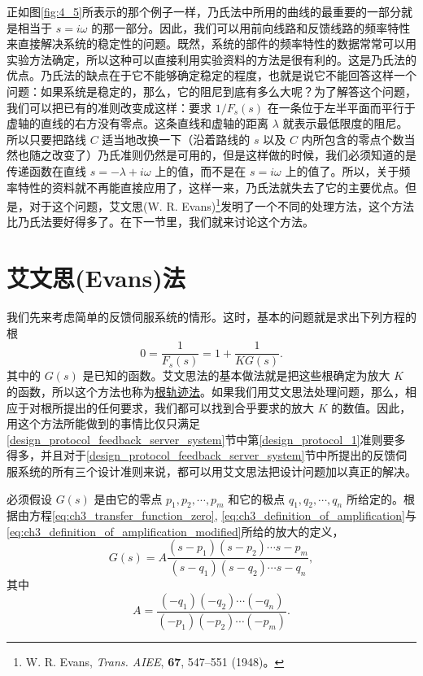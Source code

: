 正如图\ref{fig:4_5}所表示的那个例子一样，乃氏法中所用的曲线的最重要的一部分就是相当于 $s=i\omega$ 的那一部分。因此，我们可以用前向线路和反馈线路的频率特性来直接解决系统的稳定性的问题。既然，系统的部件的频率特性的数据常常可以用实验方法确定，所以这种可以直接利用实验资料的方法是很有利的。这是乃氏法的优点。乃氏法的缺点在于它不能够确定稳定的程度，也就是说它不能回答这样一个问题：如果系统是稳定的，那么，它的阻尼到底有多么大呢？为了解答这个问题，我们可以把已有的准则改变成这样：要求 $1/F_s(s)$ 在一条位于左半平面而平行于虚轴的直线的右方没有零点。这条直线和虚轴的距离 $\lambda$ 就表示最低限度的阻尼。所以只要把路线 $C$ 适当地改换一下（沿着路线的 $s$ 以及 $C$ 内所包含的零点个数当然也随之改变了）乃氏准则仍然是可用的，但是这样做的时候，我们必须知道的是传递函数在直线 $s = -\lambda + i\omega$ 上的值，而不是在 $s = i\omega$ 上的值了。所以，关于频率特性的资料就不再能直接应用了，这样一来，乃氏法就失去了它的主要优点。但是，对于这个问题，艾文思(W. R. Evans)\footnote{W. R. Evans, \textit{Trans. AIEE}, \textbf{67}, 547--551 (1948)。}发明了一个不同的处理方法，这个方法比乃氏法要好得多了。在下一节里，我们就来讨论这个方法。

\section{艾文思(Evans)法}

我们先来考虑简单的反馈伺服系统的情形。这时，基本的问题就是求出下列方程的根
\begin{equation}\label{eq:ch4_simple_feedback_server_system}
0 = \frac{1}{F_s(s)} = 1 + \frac{1}{KG(s)}.
\end{equation}
其中的 $G(s)$ 是已知的函数。艾文思法的基本做法就是把这些根确定为放大 $K$ 的函数，所以这个方法也称为\underline{根轨迹法}。如果我们用艾文思法处理问题，那么，相应于对根所提出的任何要求，我们都可以找到合乎要求的放大 $K$ 的数值。因此，用这个方法所能做到的事情比仅只满足\ref{design_protocol_feedback_server_system}节中第\ref{design_protocol_1}准则要多得多，并且对于\ref{design_protocol_feedback_server_system}节中所提出的反馈伺服系统的所有三个设计准则来说，都可以用艾文思法把设计问题加以真正的解决。

必须假设 $G(s)$ 是由它的零点 $p_1, p_2, \cdots, p_m$ 和它的极点 $q_1, q_2, \cdots, q_n$ 所给定的。根据由方程\eqref{eq:ch3_transfer_function_zero}, \eqref{eq:ch3_definition_of_amplification}与\eqref{eq:ch3_definition_of_amplification_modified}所给的放大的定义，
\begin{equation}\label{eq:ch4_known_function}
G(s) = A \frac{(s - p_1)(s - p_2)\cdots s - p_m}{(s - q_1)(s - q_2)\cdots s - q_n},
\end{equation}
其中
\begin{equation*}
A = \frac{(-q_1)(-q_2)\cdots (-q_n)}{(-p_1)(-p_2)\cdots (-p_m)}.
\end{equation*}

